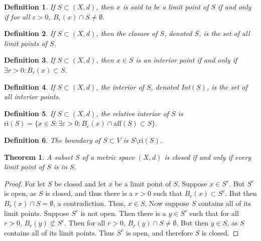 \documentclass[oneside]{book}
\theoremstyle{mystyle}
\newtheorem{theorem}{Theorem}[section]
\newtheorem{definition}{Definition}[section]
\begin{document}
\begin{definition}
If $S\subset (X,d)$, then $x$ is said to be a limit point of $S$ if and only if for all $\varepsilon>0$, $B_{\varepsilon}(x)\cap S \ne \emptyset$.
\end{definition}

\begin{definition}
If $S\subset (X,d)$, then the closure of $S$, denoted $\overline{S}$, is the set of all limit points of $S$.
\end{definition}

\begin{definition}
If $S\subset (X,d)$, then $x\in S$ is an interior point if and only if $\exists r>0:B_{r}(x)\subset S$.
\end{definition}

\begin{definition}
If $S\subset (X,d)$, the interior of $S$, denoted Int$(S)$, is the set of all interior points.
\end{definition}

\begin{definition}
If $S\subset (X,d)$, the relative interior of $S$ is $\textrm{ri}(S)= \{x\in S:\exists \varepsilon>0:B_{\varepsilon}(x)\cap \textrm{aff}(S)\subset S\}$.
\end{definition}

\begin{definition}
The boundary of $S\subset V$ is $S\setminus \textrm{ri}(S)$.
\end{definition}

\begin{theorem}
A subset $S$ of a metric space $(X,d)$ is closed if and only if every limit point of $S$ is in $S$.
\end{theorem}
\begin{proof}
For let $S$ be closed and let $x$ be a limit point of $S$. Suppose $x\in S^c$. But $S^c$ is open, as $S$ is closed, and thus there is a $r>0$ such that $B_{r}(x)\subset S^c$. But then $B_{r}(x)\cap S = \emptyset$, a contradiction. Thus, $x\in S$. Now suppose $S$ contains all of its limit points. Suppose $S^c$ is not open. Then there is a $y\in S^c$ such that for all $r>0$, $B_{r}(y)\not \subset S^c$. Then for all $r>0$, $B_{r}(y)\cap S \ne \emptyset$. But then $y\in S$, as $S$ contains all of its limit points. Thus $S^c$ is open, and therefore $S$ is closed.
\end{proof}
\end{document}
